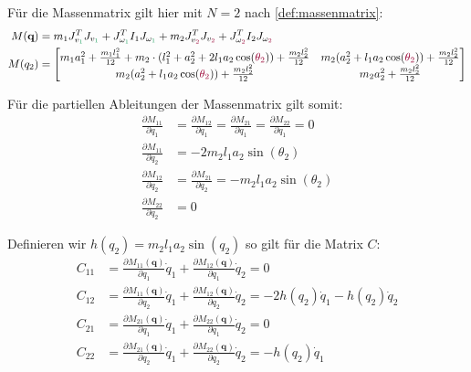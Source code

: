\documentclass[a4paper, 12pt]{scrartcl}
\newcommand{\gruen}[2][cadGreen]{\textcolor{#1}{#2}}
\newcommand{\dunkelrot}[2][dunkelrot]{\textcolor{#1}{#2}}
\begin{document}
Für die Massenmatrix gilt hier mit $N=2$ nach \ref{def:massenmatrix}:
\begin{align*}
    M(\textbf{q}) 
    &= 
    m_1 J_{v_{\gruen{1}}}^T J_{v_{\gruen{1}}} 
    + J_{\omega_{\gruen{1}}}^T I_1 J_{\omega_{\gruen{1}}}  
    + m_2 J_{v_{\dunkelrot{2}}}^T J_{v_{\dunkelrot{2}}} 
    + J_{\omega_{\dunkelrot{2}}}^T I_2 J_{\omega_{\dunkelrot{2}}} 
    \\
    M(q_2)
    &=
    \begin{bmatrix}
        m_1 a_1^2 + \frac{m_1 l_1^2}{12} 
        + 
        m_2 \cdot (l_1^2 + a_2^2 + 2 l_1 a_2  \cos(\dunkelrot{\theta_{2}})) 
        + 
        \frac{m_2 l_2^2}{12}
        & 
        m_2 (a_2^2 + l_1 a_2  \cos(\dunkelrot{\theta_{2}})) 
        +
        \frac{m_2 l_2^2}{12}
        \\
        m_2 (a_2^2 + l_1 a_2  \cos(\dunkelrot{\theta_{2}})) 
        + 
        \frac{m_2 l_2^2}{12}
        & 
        m_2 a_2^2 
        +
        \frac{m_2 l_2^2}{12}
    \end{bmatrix}
\end{align*}

Für die partiellen Ableitungen der Massenmatrix gilt somit:
\begin{align*}
    \frac{\partial M_{11}}{\partial q_1} 
    &=
    \frac{\partial M_{12}}{\partial q_1}  
    =
    \frac{\partial M_{21}}{\partial q_1}  
    =
    \frac{\partial M_{22}}{\partial q_1} 
    = 
    0
    \\
    \frac{\partial M_{11}}{\partial q_2} 
    &=
    -2m_2 l_1 a_2 \sin(\theta_2)
    \\
    \frac{\partial M_{12}}{\partial q_2} 
    &=
    \frac{\partial M_{21}}{\partial q_2}
    =
    -m_2 l_1 a_2 \sin(\theta_2)
    \\
    \frac{\partial M_{22}}{\partial q_2}
    &=
    0  
\end{align*}

Definieren wir $h(q_2) = m_2 l_1 a_2 \sin(q_2)$ so gilt für 
die Matrix $C$:
\begin{align*}
    C_{11}
    &=
    \frac{\partial M_{11}(\bm{q})}{\partial q_1} \dot{q}_1
    +
    \frac{\partial M_{12}(\bm{q})}{\partial q_1} \dot{q}_2
    =
    0
    \\
    C_{12}
    &=
    \frac{\partial M_{11}(\bm{q})}{\partial q_2} \dot{q}_1
    +
    \frac{\partial M_{12}(\bm{q})}{\partial q_2} \dot{q}_2
    =
    -2h(q_2) \dot{q}_1 - h(q_2) \dot{q}_2
    \\
    C_{21}
    &=
    \frac{\partial M_{21}(\bm{q})}{\partial q_1} \dot{q}_1
    +
    \frac{\partial M_{22}(\bm{q})}{\partial q_1} \dot{q}_2
    =
    0
    \\
    C_{22}
    &=
    \frac{\partial M_{21}(\bm{q})}{\partial q_2} \dot{q}_1
    +
    \frac{\partial M_{22}(\bm{q})}{\partial q_2} \dot{q}_2
    =
    -h(q_2) \dot{q}_1
\end{align*}
\end{document}
